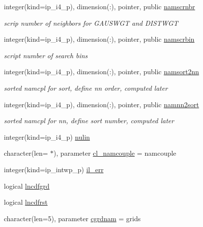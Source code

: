 \begin{DoxyCompactItemize}
integer(kind=ip\+\_\+i4\+\_\+p), dimension(\+:), pointer, public \hyperlink{namespacemod__oasis__namcouple_a20d614468823744b82118ee8cf2df852}{namscrnbr}
\begin{DoxyCompactList}\small\item\em scrip number of neighbors for G\+A\+U\+S\+W\+GT and D\+I\+S\+T\+W\+GT \end{DoxyCompactList}\item 
integer(kind=ip\+\_\+i4\+\_\+p), dimension(\+:), pointer, public \hyperlink{namespacemod__oasis__namcouple_a728405e8f669b58d00c189abf8b62437}{namscrbin}
\begin{DoxyCompactList}\small\item\em script number of search bins \end{DoxyCompactList}\item 
integer(kind=ip\+\_\+i4\+\_\+p), dimension(\+:), pointer, public \hyperlink{namespacemod__oasis__namcouple_a4555b14f38928b7f0fb7f77b9c42d0a0}{namsort2nn}
\begin{DoxyCompactList}\small\item\em sorted namcpl for sort, define nn order, computed later \end{DoxyCompactList}\item 
integer(kind=ip\+\_\+i4\+\_\+p), dimension(\+:), pointer, public \hyperlink{namespacemod__oasis__namcouple_a0ace7c451d8658759b9c8d871926a76e}{namnn2sort}
\begin{DoxyCompactList}\small\item\em sorted namcpl for nn, define sort number, computed later \end{DoxyCompactList}\item 
integer(kind=ip\+\_\+i4\+\_\+p) \hyperlink{namespacemod__oasis__namcouple_a36ef9483c332254e38c52b1d78d26f1f}{nulin}
\item 
character(len= $\ast$), parameter \hyperlink{namespacemod__oasis__namcouple_ae023a43e29bb32ebf11f193e34d8bd85}{cl\+\_\+namcouple} = \textquotesingle{}namcouple\textquotesingle{}
\item 
integer(kind=ip\+\_\+intwp\+\_\+p) \hyperlink{namespacemod__oasis__namcouple_a18b7a14f095f3cb6ace40afc06e2a5b9}{il\+\_\+err}
\item 
logical \hyperlink{namespacemod__oasis__namcouple_a5d6add8b958acc8b865b898d9e54ac73}{lncdfgrd}
\item 
logical \hyperlink{namespacemod__oasis__namcouple_a645168dae20a0c24786c3e6dcea9f2ab}{lncdfrst}
\item 
character(len=5), parameter \hyperlink{namespacemod__oasis__namcouple_afaa0549951c43335a2f8e75c7b1d2846}{cgrdnam} = \textquotesingle{}grids\textquotesingle{}

\end{DoxyCompactItemize}
